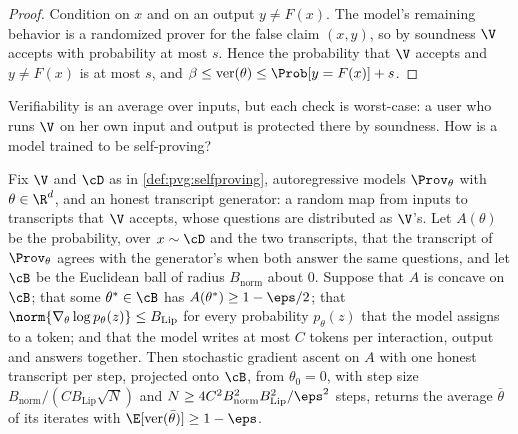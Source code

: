 \begin{refsection}

\begin{proof}
Condition on $x$ and on an output $y\ne F(x)$. The model's remaining behavior is a randomized prover for the false claim $(x,y)$, so by soundness $\V$ accepts with probability at most $s$. Hence the probability that $\V$ accepts and $y\ne F(x)$ is at most $s$, and $\beta\le\mathrm{ver}(\theta)\le\Prob[y=F(x)]+s$.
\end{proof}

Verifiability is an average over inputs, but each check is worst-case: a user who runs $\V$ on her own input and output is protected there by soundness. How is a model trained to be self-proving?

\begin{theorem}\label{thm:pvg:tl}
Fix $\V$ and $\cD$ as in \cref{def:pvg:selfproving}, autoregressive models $\Prov_\theta$ with $\theta\in\R^d$, and an honest transcript generator: a random map from inputs to transcripts that $\V$ accepts, whose questions are distributed as $\V$'s. Let $A(\theta)$ be the probability, over $x\sim\cD$ and the two transcripts, that the transcript of $\Prov_\theta$ agrees with the generator's when both answer the same questions, and let $\cB$ be the Euclidean ball of radius $B_{\mathrm{norm}}$ about $0$. Suppose that $A$ is concave on $\cB$; that some $\theta^*\in\cB$ has $A(\theta^*)\ge1-\eps/2$; that $\norm{\nabla_\theta\log p_\theta(z)}\le B_{\mathrm{Lip}}$ for every probability $p_\theta(z)$ that the model assigns to a token; and that the model writes at most $C$ tokens per interaction, output and answers together. Then stochastic gradient ascent on $A$ with one honest transcript per step, projected onto $\cB$, from $\theta_0=0$, with step size $B_{\mathrm{norm}}/(CB_{\mathrm{Lip}}\sqrt N)$ and $N\ge4C^2B_{\mathrm{norm}}^2B_{\mathrm{Lip}}^2/\eps^2$ steps, returns the average $\bar\theta$ of its iterates with $\E[\mathrm{ver}(\bar\theta)]\ge1-\eps$.
\end{theorem}


\end{refsection}
